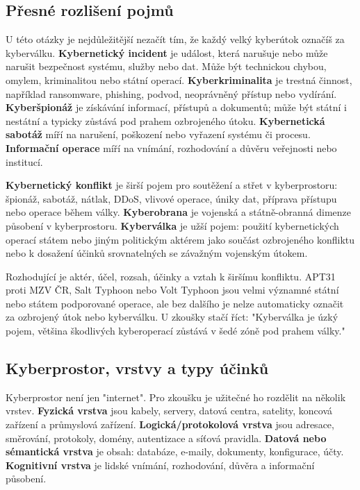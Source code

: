 \documentclass[11pt,a4paper]{article}
\begin{document}
\subsection*{Přesné rozlišení pojmů}
U této otázky je nejdůležitější nezačít tím, že každý velký kyberútok označíš za kyberválku. \textbf{Kybernetický incident} je událost, která narušuje nebo může narušit bezpečnost systému, služby nebo dat. Může být technickou chybou, omylem, kriminalitou nebo státní operací. \textbf{Kyberkriminalita} je trestná činnost, například ransomware, phishing, podvod, neoprávněný přístup nebo vydírání. \textbf{Kyberšpionáž} je získávání informací, přístupů a dokumentů; může být státní i nestátní a typicky zůstává pod prahem ozbrojeného útoku. \textbf{Kybernetická sabotáž} míří na narušení, poškození nebo vyřazení systému či procesu. \textbf{Informační operace} míří na vnímání, rozhodování a důvěru veřejnosti nebo institucí.

\textbf{Kybernetický konflikt} je širší pojem pro soutěžení a střet v kyberprostoru: špionáž, sabotáž, nátlak, DDoS, vlivové operace, úniky dat, příprava přístupu nebo operace během války. \textbf{Kyberobrana} je vojenská a státně-obranná dimenze působení v kyberprostoru. \textbf{Kyberválka} je užší pojem: použití kybernetických operací státem nebo jiným politickým aktérem jako součást ozbrojeného konfliktu nebo k dosažení účinků srovnatelných se závažným vojenským útokem.

Rozhodující je aktér, účel, rozsah, účinky a vztah k širšímu konfliktu. APT31 proti MZV ČR, Salt Typhoon nebo Volt Typhoon jsou velmi významné státní nebo státem podporované operace, ale bez dalšího je nelze automaticky označit za ozbrojený útok nebo kyberválku. U zkoušky stačí říct: "Kyberválka je úzký pojem, většina škodlivých kyberoperací zůstává v šedé zóně pod prahem války."

\subsection*{Kyberprostor, vrstvy a typy účinků}
Kyberprostor není jen "internet". Pro zkoušku je užitečné ho rozdělit na několik vrstev. \textbf{Fyzická vrstva} jsou kabely, servery, datová centra, satelity, koncová zařízení a průmyslová zařízení. \textbf{Logická/protokolová vrstva} jsou adresace, směrování, protokoly, domény, autentizace a síťová pravidla. \textbf{Datová nebo sémantická vrstva} je obsah: databáze, e-maily, dokumenty, konfigurace, účty. \textbf{Kognitivní vrstva} je lidské vnímání, rozhodování, důvěra a informační působení.
\end{document}
